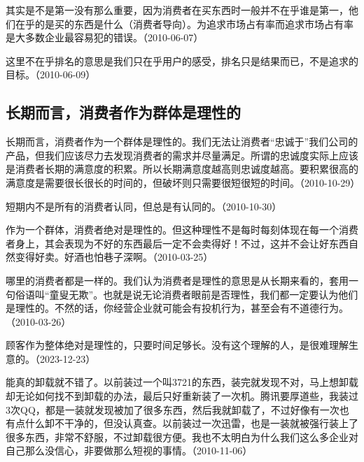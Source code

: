 
其实是不是第一没有那么重要，因为消费者在买东西时一般并不在乎谁是第一，他们在乎的是买的东西是什么（消费者导向）。为追求市场占有率而追求市场占有率是大多数企业最容易犯的错误。（2010-06-07）

这里不在乎排名的意思是我们只在乎用户的感受，排名只是结果而已，不是追求的目标。（2010-06-09）

\subsection{长期而言，消费者作为群体是理性的}


长期而言，消费者作为一个群体是理性的。我们无法让消费者“忠诚于”我们公司的产品，但我们应该尽力去发现消费者的需求并尽量满足。所谓的忠诚度实际上应该是消费者长期的满意度的积累。所以长期满意度越高则忠诚度越高。要积累很高的满意度是需要很长很长的时间的，但破坏则只需要很短很短的时间。（2010-10-29）


短期内不是所有的消费者认同，但总是有认同的。（2010-10-30）


作为一个群体，消费者绝对是理性的。但这种理性不是每时每刻体现在每一个消费者身上，其会表现为不好的东西最后一定不会卖得好！不过，这并不会让好东西自然变得好卖。好酒也怕巷子深啊。（2010-03-25）

哪里的消费者都是一样的。我们认为消费者是理性的意思是从长期来看的，套用一句俗语叫“童叟无欺”。也就是说无论消费者眼前是否理性，我们都一定要认为他们是理性的。不然的话，你经营企业就可能会有投机行为，甚至会有不道德行为。（2010-03-26）

顾客作为整体绝对是理性的，只要时间足够长。没有这个理解的人，是很难理解生意的。（2023-12-23）


能真的卸载就不错了。以前装过一个叫3721的东西，装完就发现不对，马上想卸载却无论如何找不到卸载的办法，最后只好重新装了一次机。腾讯要厚道些，我装过3次QQ，都是一装就发现被加了很多东西，然后我就卸载了，不过好像有一次也有点什么卸不干净的，但没认真查。以前装过一次迅雷，也是一装就被强行装上了很多东西，非常不舒服，不过卸载很方便。我也不太明白为什么我们这么多企业对自己那么没信心，非要做那么短视的事情。（2010-11-06）

